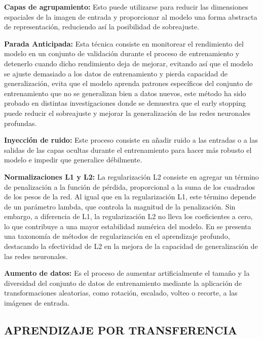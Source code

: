 \textbf{Capas de agrupamiento:} Esto puede utilizarse para reducir las dimensiones
espaciales de la imagen de entrada y proporcionar al modelo una forma abstracta de
representación, reduciendo así la posibilidad de sobreajuste.

\textbf{Parada Anticipada:} Esta técnica consiste en monitorear el rendimiento del modelo
en un conjunto de validación durante el proceso de entrenamiento y detenerlo cuando dicho
rendimiento deja de mejorar, evitando así que el modelo se ajuste demasiado a los datos de
entrenamiento y pierda capacidad de generalización, evita que el modelo aprenda patrones
específicos del conjunto de entrenamiento que no se generalizan bien a datos nuevos, este
método ha sido probado en distintas investigaciones  donde
se demuestra que el early stopping puede reducir el sobreajuste y mejorar la
generalización de las redes neuronales profundas.


\textbf{Inyección de ruido:} Este proceso consiste en añadir ruido a las entradas o a las
salidas de las capas ocultas durante el entrenamiento para hacer más robusto el modelo e
impedir que generalice débilmente.

\textbf{Normalizaciones L1 y L2:} La regularización L2 consiste en agregar un término de
penalización a la función de pérdida, proporcional a la suma de los cuadrados de los pesos
de la red. Al igual que en la regularización L1, este término depende de un parámetro
lambda, que controla la magnitud de la penalización. Sin embargo, a diferencia de L1, la
regularización L2 no lleva los coeficientes a cero, lo que contribuye a una mayor
estabilidad numérica del modelo. En  se presenta
una taxonomía de métodos de regularización en el aprendizaje profundo, destacando la
efectividad de L2 en la mejora de la capacidad de generalización de las redes neuronales.

\textbf{Aumento de datos:} Es el proceso de aumentar artificialmente el tamaño y la
diversidad del conjunto de datos de entrenamiento mediante la aplicación de
transformaciones aleatorias, como rotación, escalado, volteo o recorte, a las imágenes de
entrada.








\subsection{APRENDIZAJE POR TRANSFERENCIA}

